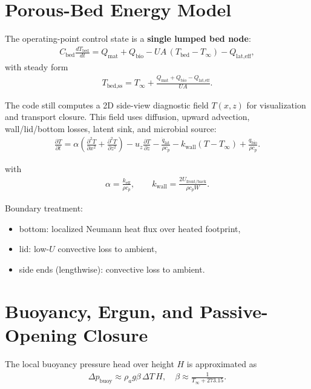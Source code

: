 \documentclass[11pt]{article}
\begin{document}
\section{Porous-Bed Energy Model}
The operating-point control state is a \textbf{single lumped bed node}:
\begin{align}
C_{\text{bed}}\frac{dT_{\text{bed}}}{dt} =
Q_{\text{mat}} + Q_{\text{bio}}
- UA\,(T_{\text{bed}}-T_\infty)
- Q_{\text{lat,eff}},
\end{align}
with steady form
\begin{align}
T_{\text{bed,ss}} = T_\infty + \frac{Q_{\text{mat}}+Q_{\text{bio}}-Q_{\text{lat,eff}}}{UA}.
\end{align}

The code still computes a 2D side-view diagnostic field $T(x,z)$ for visualization and
transport closure. This field uses diffusion, upward advection, wall/lid/bottom losses,
latent sink, and microbial source:
\begin{align}
\frac{\partial T}{\partial t} =
\alpha\left(\frac{\partial^2T}{\partial x^2}+\frac{\partial^2T}{\partial z^2}\right)
- u_z\frac{\partial T}{\partial z}
- \frac{\dot q_{\text{lat}}}{\rho c_p}
- k_{\text{wall}}(T-T_\infty)
+ \frac{q_{\text{bio}}}{\rho c_p}.
\end{align}

\noindent with
\begin{align*}
\alpha = \frac{k_{\text{eff}}}{\rho c_p}, \qquad
k_{\text{wall}} = \frac{2U_{\text{front/back}}}{\rho c_p W}.
\end{align*}

Boundary treatment:
\begin{itemize}
\item bottom: localized Neumann heat flux over heated footprint,
\item lid: low-$U$ convective loss to ambient,
\item side ends (lengthwise): convective loss to ambient.
\end{itemize}

\section{Buoyancy, Ergun, and Passive-Opening Closure}
The local buoyancy pressure head over height $H$ is approximated as
\begin{align}
\Delta p_{\text{buoy}} \approx \rho_a g\beta\,\Delta T\,H,
\quad \beta\approx \frac{1}{T_\infty+273.15}.
\end{align}
\end{document}
